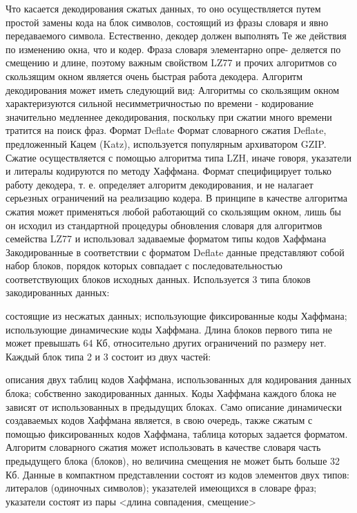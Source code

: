 \documentclass[12pt]{article}
\begin{document}
    Что касается декодирования сжатых данных, то оно осуществляется путем простой замены кода на блок символов, состоящий из фразы словаря и явно передаваемого символа. Естественно, декодер должен выполнять Те же действия по изменению окна, что и кодер. Фраза словаря элементарно опре- деляется по смещению и длине, поэтому важным свойством LZ77 и прочих алгоритмов со скользящим окном является очень быстрая работа декодера.
    Алгоритм декодирования может иметь следующий вид:
    Алгоритмы со скользящим окном характеризуются сильной несимметричностью по времени - кодирование значительно медленнее декодирования, поскольку при сжатии много времени тратится на поиск фраз.
    Формат Deflate
    Формат словарного сжатия Deflate, предложенный Кацем (Katz), используется популярным архиватором GZIP. Сжатие осуществляется с помощью алгоритма типа LZH, иначе говоря, указатели и литералы кодируются по методу Хаффмана. Формат специфицирует только работу декодера, т. е. определяет алгоритм декодирования, и не налагает серьезных ограничений на реализацию кодера. В принципе в качестве алгоритма сжатия может применяться любой работающий со скользящим окном, лишь бы он исходил из стандартной процедуры обновления словаря для алгоритмов семейства LZ77 и использовал задаваемые форматом типы кодов Хаффмана
    Закодированные в соответствии с форматом Deflate данные представляют собой набор блоков, порядок которых совпадает с последовательностью соответствующих блоков исходных данных. Используется 3 типа блоков закодированных данных:

    состоящие из несжатых данных;
    использующие фиксированные коды Хаффмана;
    использующие динамические коды Хаффмана.
    Длина блоков первого типа не может превышать 64 Кб, относительно других ограничений по размеру нет. Каждый блок типа 2 и 3 состоит из двух частей:

    описания двух таблиц кодов Хаффмана, использованных для кодирования данных блока;
    собственно закодированных данных.
    Коды Хаффмана каждого блока не зависят от использованных в предыдущих блоках. Cамо описание динамически создаваемых кодов Хаффмана является, в свою очередь, также сжатым с помощью фиксированных кодов Хаффмана, таблица которых задается форматом.
    Алгоритм словарного сжатия может использовать в качестве словаря часть предыдущего блока (блоков), но величина смещения не может быть больше 32 Кб. Данные в компактном представлении состоят из кодов элементов двух типов:
    литералов (одиночных символов);
    указателей имеющихся в словаре фраз; указатели состоят из пары <длина совпадения, смещение>
\end{document}
